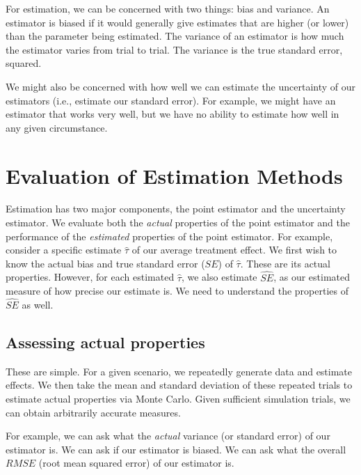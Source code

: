 \documentclass[
]{book}
\begin{document}
For estimation, we can be concerned with two things: bias and variance.
An estimator is biased if it would generally give estimates that are higher (or lower) than the parameter being estimated.
The variance of an estimator is how much the estimator varies from trial to trial.
The variance is the true standard error, squared.

We might also be concerned with how well we can estimate the uncertainty of our estimators (i.e., estimate our standard error).
For example, we might have an estimator that works very well, but we have no ability to estimate how well in any given circumstance.

\hypertarget{evaluation-of-estimation-methods}{%
\section{Evaluation of Estimation Methods}\label{evaluation-of-estimation-methods}}

Estimation has two major components, the point estimator and the uncertainty estimator.
We evaluate both the \emph{actual} properties of the point estimator and the performance of the \emph{estimated} properties of the point estimator.
For example, consider a specific estimate \(\hat{\tau}\) of our average treatment effect.
We first wish to know the actual bias and true standard error (\(SE\)) of \(\hat{\tau}\).
These are its actual properties.
However, for each estimated \(\hat{\tau}\), we also estimate \(\widehat{SE}\), as our estimated measure of how precise our estimate is.
We need to understand the properties of \(\widehat{SE}\) as well.

\hypertarget{assessing-actual-properties}{%
\subsection{Assessing actual properties}\label{assessing-actual-properties}}

These are simple.
For a given scenario, we repeatedly generate data and estimate effects.
We then take the mean and standard deviation of these repeated trials to estimate actual properties via Monte Carlo.
Given sufficient simulation trials, we can obtain arbitrarily accurate measures.

For example, we can ask what the \emph{actual} variance (or standard error) of our estimator is.
We can ask if our estimator is biased.
We can ask what the overall \(RMSE\) (root mean squared error) of our estimator is.
\end{document}
